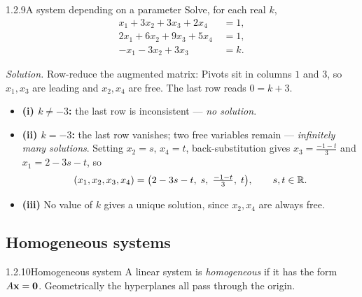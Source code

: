 \begin{exmp}{1.2.9}{A system depending on a parameter}
Solve, for each real $k$,
\[
\begin{aligned}
x_1+3x_2+3x_3+2x_4&=1,\\
2x_1+6x_2+9x_3+5x_4&=1,\\
-x_1-3x_2+3x_3\phantom{{}+5x_4}&=k.
\end{aligned}
\]

\smallskip
\noindent\textit{Solution.} Row-reduce the augmented matrix:
Pivots sit in columns $1$ and $3$, so $x_1,x_3$ are leading and $x_2,x_4$ are free. The last row reads $0=k+3$.
\begin{itemize}[leftmargin=1.4em,itemsep=1pt]
\item \textbf{(i) $k\neq-3$:} the last row is inconsistent --- \emph{no solution}.
\item \textbf{(ii) $k=-3$:} the last row vanishes; two free variables remain --- \emph{infinitely many solutions}. Setting $x_2=s,\,x_4=t$, back-substitution gives $x_3=\tfrac{-1-t}{3}$ and $x_1=2-3s-t$, so
\[
(x_1,x_2,x_3,x_4)=\bigl(2-3s-t,\;s,\;\tfrac{-1-t}{3},\;t\bigr),\qquad s,t\in\mathbb{R}.
\]
\item \textbf{(iii)} No value of $k$ gives a unique solution, since $x_2,x_4$ are always free.
\end{itemize}
\end{exmp}

\subsection{Homogeneous systems}

\begin{defns}{1.2.10}{Homogeneous system}
A linear system is \emph{homogeneous} if it has the form $A\mathbf{x}=\mathbf{0}$. Geometrically the hyperplanes all pass through the origin.
\end{defns}


